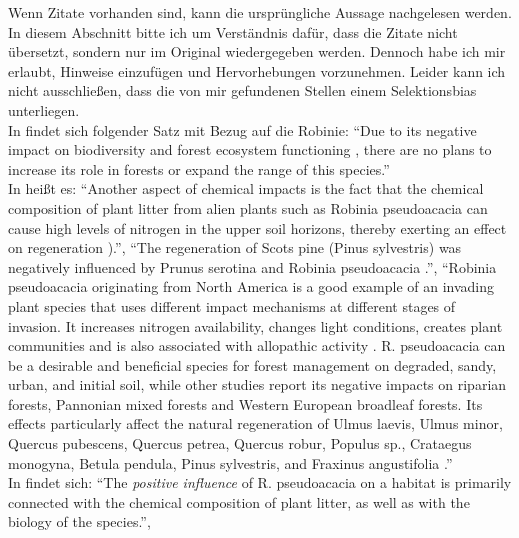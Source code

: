 \documentclass[twocolumn]{scrartcl}
\begin{document}
Wenn Zitate vorhanden sind, kann die ursprüngliche Aussage nachgelesen
werden. In diesem Abschnitt bitte ich um Verständnis dafür, dass die
Zitate nicht übersetzt, sondern nur im Original wiedergegeben
werden. Dennoch habe ich mir erlaubt, Hinweise einzufügen und
Hervorhebungen vorzunehmen. Leider kann ich nicht ausschließen,
dass die von mir gefundenen Stellen einem Selektionsbias unterliegen.\\
In \citep{szyp2023robinieGenetik} findet sich folgender Satz mit Bezug auf
die Robinie:
\enquote{Due to its negative impact on biodiversity and forest
  ecosystem functioning \citep{langmaier2020alienPlants}, there are no
  plans to increase its role in forests or expand the range of this
  species.}\\
In \citep{langmaier2020alienPlants} heißt es:
\enquote{Another aspect of chemical impacts is the fact that the
  chemical composition of plant litter from alien plants such as
  Robinia pseudoacacia can cause high levels of nitrogen in the upper
  soil horizons, thereby exerting an effect on regeneration
  \citep{rahmonov2009robinieLitter}).},
\enquote{The regeneration of Scots pine (Pinus sylvestris) was
  negatively influenced by Prunus serotina and Robinia pseudoacacia
  \citep{sebert2007invasive,rahmonov2009robinieLitter}.},
\enquote{Robinia pseudoacacia originating from North America is a good
  example of an invading plant species that uses different impact
  mechanisms at different stages of invasion. It increases nitrogen
  availability, changes light conditions, creates plant communities
  and is also associated with allopathic activity
  \citep{rahmonov2009robinieLitter,campagnaro2018alien}.
  R. pseudoacacia can be a desirable and beneficial species for forest
  management on degraded, sandy, urban, and initial soil, while other
  studies report its negative impacts on riparian forests, Pannonian
  mixed forests and Western European broadleaf forests. Its effects
  particularly affect the natural regeneration of Ulmus laevis, Ulmus
  minor, Quercus pubescens, Quercus petrea, Quercus robur, Populus
  sp., Crataegus monogyna, Betula pendula, Pinus sylvestris, and
  Fraxinus angustifolia
  \citep{rahmonov2009robinieLitter,maringer2012robinePostFire,petrasova2013neophyten,radtke2013robinieNiederwald,terwei2013nonNative}.}\\
In \citet{rahmonov2009robinieLitter} findet sich:
\enquote{The \emph{positive influence} of R. pseudoacacia on a habitat
  is primarily connected with the chemical composition of plant
  litter, as well as with the biology of the species.},
\end{document}
